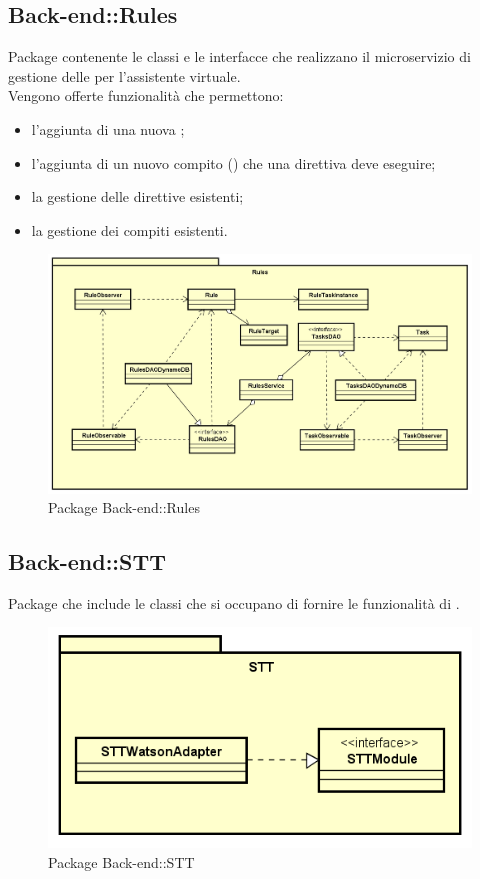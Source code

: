 \subsection{Back-end::Rules}
Package contenente le classi e le interfacce che realizzano il microservizio di gestione delle  per l'assistente virtuale.\\ Vengono offerte funzionalità che permettono: \begin{itemize} \item l'aggiunta di una nuova ; \item l'aggiunta di un nuovo compito () che una direttiva deve eseguire; \item la gestione delle direttive esistenti; \item la gestione dei compiti esistenti. \end{itemize}
\begin{figure}[h] \centering \includegraphics[width=\textwidth,height=\textheight,keepaspectratio]{images/diagrams/back-end/Official_Backend_0304/Rules.png}
\caption{Package Back-end::Rules}
\end{figure}
\newpage

\subsection{Back-end::STT}
Package che include le classi che si occupano di fornire le funzionalità di .
\begin{figure}[h] \centering \includegraphics[width=\textwidth,height=\textheight,keepaspectratio]{images/diagrams/back-end/Official_Backend_0304/STT.png}
\caption{Package Back-end::STT}
\end{figure}
\newpage

